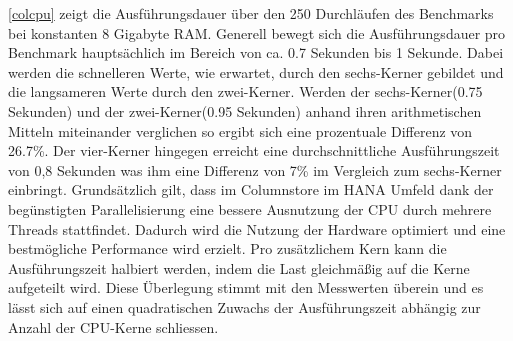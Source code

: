 \begin{figure}[H]
\end{figure}


\autoref{colcpu} zeigt die Ausführungsdauer über den 250 Durchläufen des Benchmarks bei konstanten 8 Gigabyte RAM. Generell bewegt sich die Ausführungsdauer pro Benchmark hauptsächlich im Bereich von ca. 0.7 Sekunden bis 1 Sekunde. Dabei werden die schnelleren Werte, wie erwartet, durch den sechs-Kerner gebildet und die langsameren Werte durch den zwei-Kerner. Werden der sechs-Kerner(0.75 Sekunden) und der zwei-Kerner(0.95 Sekunden) anhand ihren arithmetischen Mitteln miteinander verglichen so ergibt sich eine prozentuale Differenz von 26.7\%. Der vier-Kerner hingegen erreicht eine durchschnittliche Ausführungszeit von 0,8 Sekunden was ihm eine Differenz von 7\% im Vergleich zum sechs-Kerner einbringt. 
Grundsätzlich gilt, dass im Columnstore im HANA Umfeld dank der begünstigten Parallelisierung eine bessere Ausnutzung der CPU durch mehrere Threads stattfindet. Dadurch wird die Nutzung der Hardware optimiert und eine bestmögliche Performance wird erzielt. Pro zusätzlichem Kern kann die Ausführungszeit halbiert werden, indem die Last gleichmäßig auf die Kerne aufgeteilt wird. Diese Überlegung stimmt mit den Messwerten überein und es lässt sich auf einen quadratischen Zuwachs der Ausführungszeit abhängig zur Anzahl der CPU-Kerne schliessen. 

\begin{figure}[H]
\end{figure}

